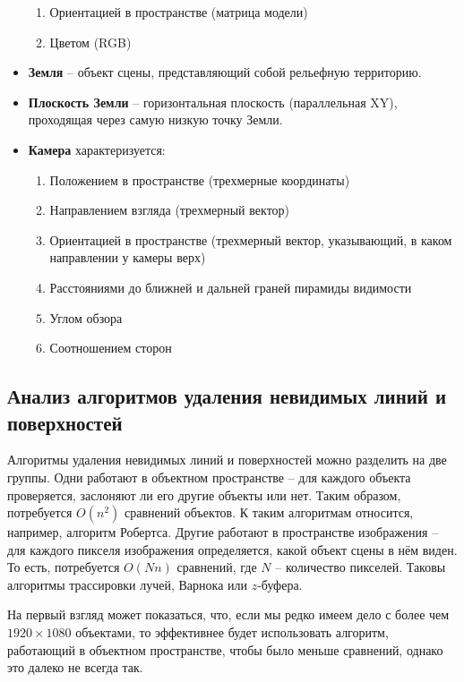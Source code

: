 \begin{itemize}
\begin{enumerate}[label=(\alph*)]
            \item Ориентацией в пространстве (матрица модели)
            \item Цветом ({RGB})
        \end{enumerate}
    \item \textbf{Земля} -- {объект сцены}, представляющий собой рельефную территорию.
    \item \textbf{Плоскость Земли} -- горизонтальная плоскость (параллельная {XY}), проходящая через самую низкую точку {Земли}.
    \item \textbf{Камера} характеризуется:
        \begin{enumerate}[label=(\alph*)]
            \item Положением в пространстве (трехмерные координаты)
            \item Направлением взгляда (трехмерный вектор)
            \item Ориентацией в пространстве (трехмерный вектор, указывающий, в каком направлении у камеры верх)
            \item Расстояниями до ближней и дальней граней пирамиды видимости
            \item Углом обзора
            \item Соотношением сторон
        \end{enumerate}
\end{itemize}

\subsection{Анализ алгоритмов удаления невидимых линий и поверхностей}

Алгоритмы удаления невидимых линий и поверхностей можно разделить на две
группы. Одни работают в объектном пространстве -- для каждого объекта
проверяется, заслоняют ли его другие объекты или нет. Таким образом,
потребуется $O(n^2)$ сравнений объектов. К таким алгоритмам относится,
например, алгоритм Робертса. Другие работают в пространстве изображения -- для
каждого пикселя изображения определяется, какой объект сцены в нём виден. То
есть, потребуется $O(Nn)$ сравнений, где $N$ -- количество пикселей. Таковы
алгоритмы трассировки лучей, Варнока или $z$-буфера.

На первый взгляд может показаться, что, если мы редко имеем дело с более чем
$1920 \times 1080$ объектами, то эффективнее будет использовать алгоритм,
работающий в объектном пространстве, чтобы было меньше сравнений, однако это
далеко не всегда так.

